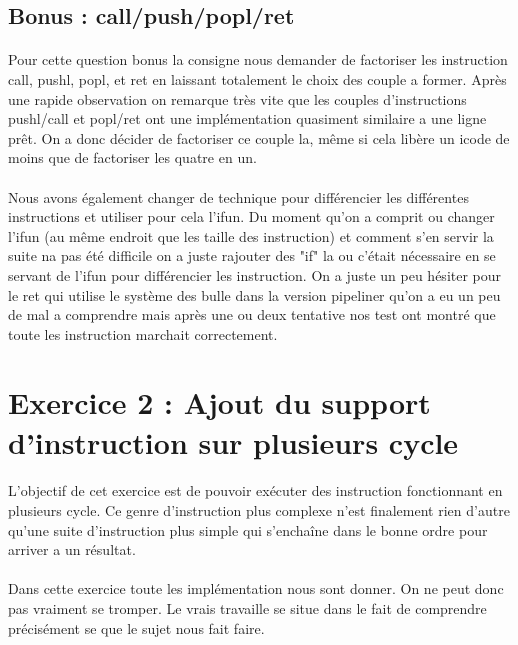 \documentclass[12pt]{article}
\begin{document}
\subsection{Bonus : call/push/popl/ret}

\paragraph{} Pour cette question bonus la consigne nous demander de factoriser les instruction call, pushl, popl, et ret en laissant totalement le choix des couple a former.
Après une rapide observation on remarque très vite que les couples d'instructions pushl/call et popl/ret ont une implémentation quasiment similaire a une ligne prêt. On a donc décider de factoriser ce couple la, même si cela libère un icode de moins que de factoriser les quatre en un.

\paragraph{} Nous avons également changer de technique pour différencier les différentes instructions et utiliser pour cela l'ifun.
Du moment qu'on a comprit ou changer l'ifun (au même endroit que les taille des instruction) et comment s'en servir la suite na pas été difficile on a juste rajouter des "if" la ou c’était nécessaire en se servant de l'ifun pour différencier les instruction. On a juste un peu hésiter pour le ret qui utilise le système des bulle dans la version pipeliner qu'on a eu un peu de mal a comprendre mais après une ou deux tentative nos test ont montré que toute les instruction marchait correctement.



\newpage

\section{Exercice 2 : Ajout du support d'instruction sur plusieurs cycle}

\paragraph{}L'objectif de cet exercice est de pouvoir exécuter des instruction fonctionnant en plusieurs cycle. Ce genre d'instruction plus complexe n'est finalement rien d'autre qu'une suite d'instruction plus simple qui s’enchaîne dans le bonne ordre pour arriver a un résultat.

\paragraph{} Dans cette exercice toute les implémentation nous sont donner. On ne peut donc pas vraiment se tromper. Le vrais travaille se situe dans le fait de comprendre précisément se que le sujet nous fait faire.
\end{document}
